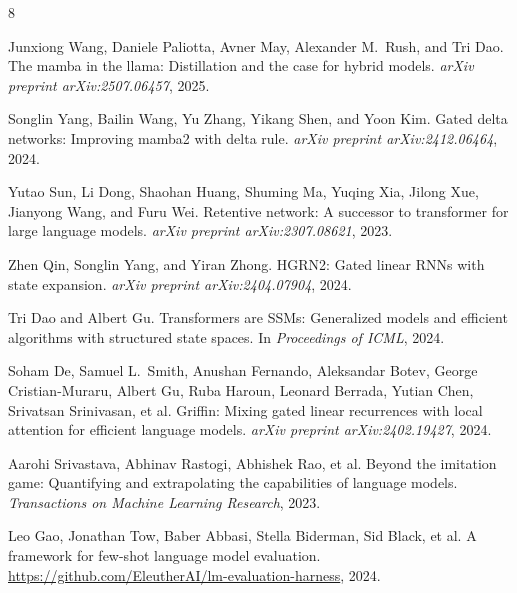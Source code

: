 \documentclass[11pt,twocolumn,a4paper]{article}
\begin{document}
\begin{thebibliography}{8}

Junxiong Wang, Daniele Paliotta, Avner May, Alexander M.\ Rush, and Tri Dao.
The mamba in the llama: Distillation and the case for hybrid models.
{\em arXiv preprint arXiv:2507.06457}, 2025.

Songlin Yang, Bailin Wang, Yu Zhang, Yikang Shen, and Yoon Kim.
Gated delta networks: Improving mamba2 with delta rule.
{\em arXiv preprint arXiv:2412.06464}, 2024.

Yutao Sun, Li Dong, Shaohan Huang, Shuming Ma, Yuqing Xia, Jilong Xue, Jianyong Wang, and Furu Wei.
Retentive network: A successor to transformer for large language models.
{\em arXiv preprint arXiv:2307.08621}, 2023.

Zhen Qin, Songlin Yang, and Yiran Zhong.
HGRN2: Gated linear RNNs with state expansion.
{\em arXiv preprint arXiv:2404.07904}, 2024.

Tri Dao and Albert Gu.
Transformers are SSMs: Generalized models and efficient algorithms with structured state spaces.
In {\em Proceedings of ICML}, 2024.

Soham De, Samuel L.\ Smith, Anushan Fernando, Aleksandar Botev, George Cristian-Muraru, Albert Gu, Ruba Haroun, Leonard Berrada, Yutian Chen, Srivatsan Srinivasan, et al.
Griffin: Mixing gated linear recurrences with local attention for efficient language models.
{\em arXiv preprint arXiv:2402.19427}, 2024.

Aarohi Srivastava, Abhinav Rastogi, Abhishek Rao, et al.
Beyond the imitation game: Quantifying and extrapolating the capabilities of language models.
{\em Transactions on Machine Learning Research}, 2023.

Leo Gao, Jonathan Tow, Baber Abbasi, Stella Biderman, Sid Black, et al.
A framework for few-shot language model evaluation.
\url{https://github.com/EleutherAI/lm-evaluation-harness}, 2024.

\end{thebibliography}
\end{document}

